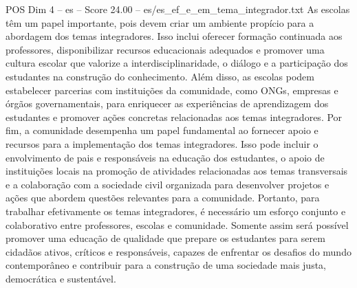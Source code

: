 \begin{textsample}{POS Dim 4 – es – Score 24.00 – es/es\_ef\_e\_em\_tema\_integrador.txt}
As escolas têm um papel importante, pois devem criar um ambiente propício para a abordagem dos temas integradores.
Isso inclui oferecer formação continuada aos professores, disponibilizar recursos educacionais adequados e promover uma cultura escolar que valorize a interdisciplinaridade, o diálogo e a participação dos estudantes na construção do conhecimento.
Além disso, as escolas podem estabelecer parcerias com instituições da comunidade, como ONGs, empresas e órgãos governamentais, para enriquecer as experiências de aprendizagem dos estudantes e promover ações concretas relacionadas aos temas integradores.
Por fim, a comunidade desempenha um papel fundamental ao fornecer apoio e recursos para a implementação dos temas integradores.
Isso pode incluir o envolvimento de pais e responsáveis na educação dos estudantes, o apoio de instituições locais na promoção de atividades relacionadas aos temas transversais e a colaboração com a sociedade civil organizada para desenvolver projetos e ações que abordem questões relevantes para a comunidade.
Portanto, para trabalhar efetivamente os temas integradores, é necessário um esforço conjunto e colaborativo entre professores, escolas e comunidade.
Somente assim será possível promover uma educação de qualidade que prepare os estudantes para serem cidadãos ativos, críticos e responsáveis, capazes de enfrentar os desafios do mundo contemporâneo e contribuir para a construção de uma sociedade mais justa, democrática e sustentável.

\end{textsample}
